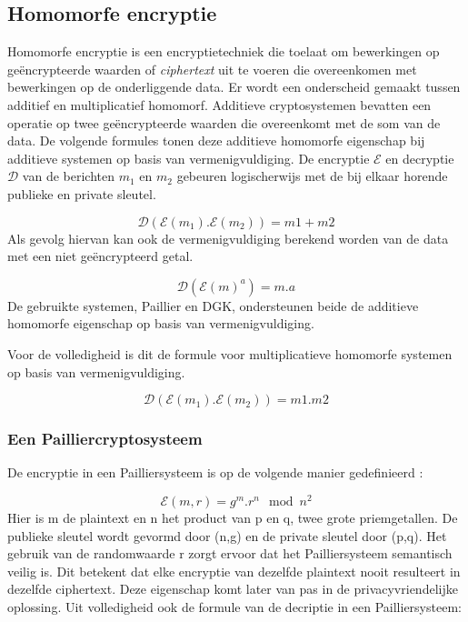 \subsection{Homomorfe encryptie}
Homomorfe encryptie is een encryptietechniek die toelaat om bewerkingen op ge\"encrypteerde waarden of \emph{ciphertext} uit te voeren die overeenkomen met bewerkingen op de onderliggende data. Er wordt een onderscheid gemaakt tussen additief en multiplicatief homomorf. Additieve cryptosystemen bevatten een operatie op twee ge\"encrypteerde waarden die overeenkomt met de som van de data. De volgende formules \cite{erkin:generating} tonen deze additieve homomorfe eigenschap bij additieve systemen op basis van vermenigvuldiging. De encryptie $\mathcal{E}$ en decryptie $\mathcal{D}$ van de berichten $m_1$ en $m_2$ gebeuren logischerwijs met de bij elkaar horende publieke en private sleutel.

\begin{equation}\label{homoplus}\mathcal{D}(\mathcal{E}(m_1).\mathcal{E}(m_2)) = m1 + m2
\end{equation}
Als gevolg hiervan kan ook de vermenigvuldiging berekend worden van de data met een niet ge\"encrypteerd getal.

\begin{equation}\label{homomaal}\mathcal{D}(\mathcal{E}(m)^a) = m.a
\end{equation}
De gebruikte systemen, Paillier en DGK, ondersteunen beide de additieve homomorfe eigenschap op basis van vermenigvuldiging.

Voor de volledigheid is dit de formule voor multiplicatieve homomorfe systemen op basis van vermenigvuldiging.

\begin{equation}\mathcal{D}(\mathcal{E}(m_1).\mathcal{E}(m_2)) = m1 . m2
\end{equation}
\subsubsection{Een Pailliercryptosysteem}
\label{paillier}
De encryptie in een Pailliersysteem is op de volgende manier gedefinieerd \cite{erkin:generating}:

\begin{equation}\label{paillierenc}\mathcal{E}(m,r) = g^m.r^n\mod n^2
\end{equation}
Hier is m de plaintext en n het product van p en q, twee grote priemgetallen. De publieke sleutel wordt gevormd door (n,g) en de private sleutel door (p,q). Het gebruik van de randomwaarde r zorgt ervoor dat het Pailliersysteem semantisch veilig is. Dit betekent dat elke encryptie van dezelfde plaintext nooit resulteert in dezelfde ciphertext. Deze eigenschap komt later van pas in de privacyvriendelijke oplossing. Uit volledigheid ook de formule van de decriptie in een Pailliersysteem:

